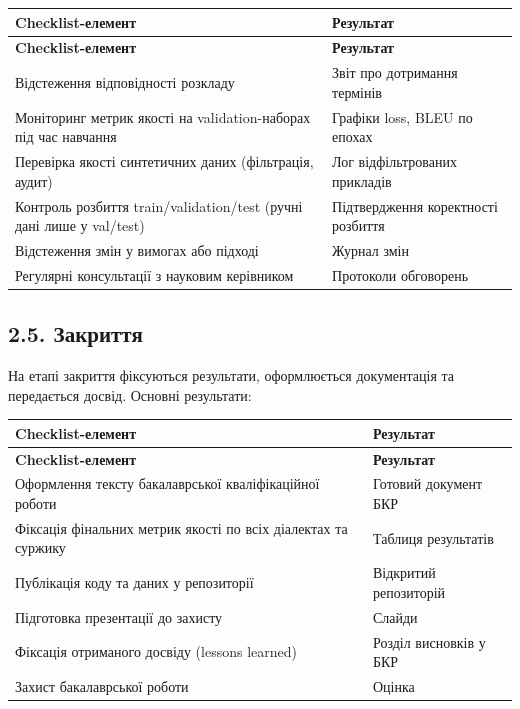\documentclass[14pt]{extarticle}
\begin{document}
\begin{longtable}{|p{}|p{}|}
\hline
\textbf{Checklist-елемент} & \textbf{Результат} \\
\hline
\endfirsthead
\hline
\textbf{Checklist-елемент} & \textbf{Результат} \\
\hline
\endhead
Відстеження відповідності розкладу & Звіт про дотримання термінів \\
\hline
Моніторинг метрик якості на validation-наборах під час навчання & Графіки loss, BLEU по епохах \\
\hline
Перевірка якості синтетичних даних (фільтрація, аудит) & Лог відфільтрованих прикладів \\
\hline
Контроль розбиття train/validation/test (ручні дані лише у val/test) & Підтвердження коректності розбиття \\
\hline
Відстеження змін у вимогах або підході & Журнал змін \\
\hline
Регулярні консультації з науковим керівником & Протоколи обговорень \\
\hline
\end{longtable}

\subsection*{2.5. Закриття}

На етапі закриття фіксуються результати, оформлюється документація та передається досвід. Основні результати:

\begin{longtable}{|p{}|p{}|}
\hline
\textbf{Checklist-елемент} & \textbf{Результат} \\
\hline
\endfirsthead
\hline
\textbf{Checklist-елемент} & \textbf{Результат} \\
\hline
\endhead
Оформлення тексту бакалаврської кваліфікаційної роботи & Готовий документ БКР \\
\hline
Фіксація фінальних метрик якості по всіх діалектах та суржику & Таблиця результатів \\
\hline
Публікація коду та даних у репозиторії & Відкритий репозиторій \\
\hline
Підготовка презентації до захисту & Слайди \\
\hline
Фіксація отриманого досвіду (lessons learned) & Розділ висновків у БКР \\
\hline
Захист бакалаврської роботи & Оцінка \\
\hline
\end{longtable}
\end{document}
